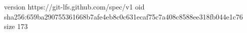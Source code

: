 version https://git-lfs.github.com/spec/v1
oid sha256:659ba290755361668b7afe4eb8c0c631ecaf75c7a408c8588ee318fb044e1c76
size 173
